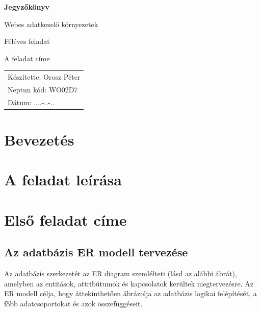 \documentclass{article}
\begin{document}
    \onehalfspacing %
    \justifying %

    \begin{titlepage}
        \centering
        \vspace*{0.25\textheight}
        {\fontsize{64}{32}\bfseries Jegyzőkönyv \par}
        \vspace{1.5em}
        {\fontsize{25}{64}\normalfont Webes adatkezelő környezetek \par}
        \vspace{1em}
        {\fontsize{25}{32}\normalfont Féléves feladat \par}
        \vspace{1em}
        {\fontsize{25}{32}\normalfont A feladat címe \par}
        \vspace*{0.20\textheight}

        \begin{flushright}
            \begin{tabular}{@{}l@{}}
                {\fontsize{14}{14}\normalfont Készítette: Orosz Péter} \\
                {\fontsize{14}{14}\normalfont Neptun kód: WO02D7} \\
                {\fontsize{14}{14}\normalfont Dátum: ....-..-..} \\
            \end{tabular}
        \end{flushright}
    \end{titlepage}

    \tableofcontents
    \newpage

    \section*{Bevezetés}

    \section*{A feladat leírása}

    \section{Első feladat címe}
  \subsection{Az adatbázis ER modell tervezése}
    Az adatbázis szerkezetét az ER diagram szemlélteti (lásd az alábbi ábrát), amelyben az entitások, attribútumok és kapcsolatok kerültek megtervezésre. Az ER modell célja, hogy áttekinthetően ábrázolja az adatbázis logikai felépítését, a főbb adatcsoportokat és azok összefüggéseit.
\end{document}
